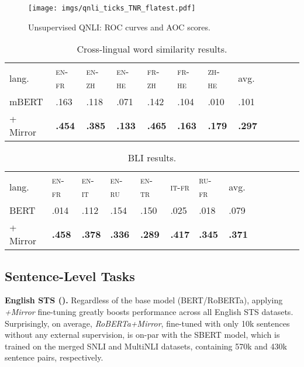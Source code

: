 \documentclass[11pt]{article}
\newcommand{\en}{{\textsc{en}}\xspace}
\newcommand{\zh}{{\textsc{zh}}\xspace}
\newcommand{\tr}{{\textsc{tr}}\xspace}
\newcommand{\ru}{{\textsc{ru}}\xspace}
\newcommand{\fr}{{\textsc{fr}}\xspace}
\newcommand{\ita}{{\textsc{it}}\xspace}
\newcommand{\he}{{\textsc{he}}\xspace}
\begin{document}
\begin{figure}[t!]
    \centering
    \texttt{[image: imgs/qnli\_ticks\_TNR\_flatest.pdf]}
\caption{Unsupervised QNLI: ROC curves and AOC scores.}
    \label{fig:qnli}
\end{figure}
\begin{table}[!t] \centering
\setlength{\tabcolsep}{2.0pt}
\def\arraystretch{0.8}
\scriptsize
\begin{tabularx}{\linewidth}{lXXXXXXXXXXX}
\cmidrule[1.0pt]{1-10}
lang. & \en-\fr & \en-\zh & \en-\he & \fr-\zh & \fr-\he & \zh-\he & avg.\\
\cmidrule[1.0pt]{1-10}
mBERT & .163 & .118 & .071 & .142 & .104 & .010 & .101\\
\rowcolor{blue!10}
+ Mirror  & \textbf{.454} & \textbf{.385} & \textbf{.133} & \textbf{.465} & \textbf{.163} & \textbf{.179} & \textbf{.297} \\
\cmidrule[1.0pt]{1-10}
\end{tabularx}
\caption{Cross-lingual word similarity results.}
\label{tab:ws_xling}
\end{table}
\begin{table}[!t] \centering
\setlength{\tabcolsep}{2.2pt}
\def\arraystretch{0.8}
\scriptsize
\begin{tabularx}{\linewidth}{lXXXXXXXXXXXX}
\cmidrule[1.0pt]{1-10}
lang. & \en-\fr & \en-\ita & \en-\ru & \en-\tr & \ita-\fr & \ru-\fr & avg. \\
\cmidrule[1.0pt]{1-10}
BERT & .014 & .112 & .154 & .150 & .025 & .018 & .079 \\
\rowcolor{blue!10}
+ Mirror  & \textbf{.458} & \textbf{.378} & \textbf{.336} & \textbf{.289} & \textbf{.417} & \textbf{.345} & \textbf{.371} \\
\cmidrule[1.0pt]{1-10}
\end{tabularx}
\caption{BLI results.}
\label{tab:bli}
\end{table}



\subsection{Sentence-Level Tasks}\label{sec:sentence}




\noindent \textbf{English STS ().} Regardless of the base model (BERT/RoBERTa), applying  \textit{+Mirror} fine-tuning greatly boosts performance across all English STS datasets. Surprisingly, on average, \textit{RoBERTa+Mirror}, fine-tuned with only 10k sentences without any external supervision, is on-par with the SBERT model, which is trained on the merged SNLI \citep{bowman-etal-2015-large} and MultiNLI \citep{Williams:2018naacl} datasets, containing 570k and 430k sentence pairs, respectively. 
\end{document}
